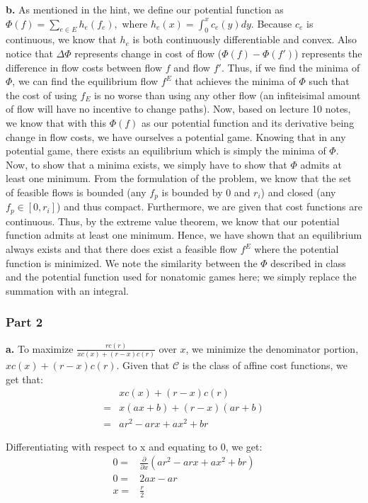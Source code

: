 \documentclass[12 pt]{article}
\begin{document}
	\noindent \textbf{b.} As mentioned in the hint, we define our potential function as  $\Phi(f) = \sum_{e \in E} h_e(f_e),$ where	$h_e(x) = \int_0^x c_e(y) dy.$ Because $c_e$ is continuous, we know that $h_e$ is both continuously differentiable and convex. Also notice that $\Delta \Phi$ represents change in cost of flow ($\Phi(f) - \Phi(f')$) represents the difference in flow costs between flow $f$ and flow $f'$. Thus, if we find the minima of $\Phi$, we can find the equilibrium flow $f^E$ that achieves the minima of $\Phi$ such that the cost of using $f_E$ is no worse than using any other flow (an infiteisimal amount of flow will have no incentive to change paths). Now, based on lecture 10 notes, we know that with this $\Phi(f)$ as our potential function and its derivative being change in flow costs, we have ourselves a potential game. Knowing that in any potential game, there exists an equilibrium which is simply the minima of $\Phi$. Now, to show that a minima exists, we simply have to show that $\Phi$ admits at least one minimum. From the formulation of the problem, we know that the set of feasible flows is bounded (any $f_p$ is bounded by 0 and $r_i$) and closed (any $f_p \in [0, r_i]$) and thus compact. Furthermore, we are given that cost functions are continuous. Thus, by the extreme value theorem, we know that our potential function admits at least one minimum. Hence, we have shown that an equilibrium always exists and that there does exist a feasible flow $f^E$ where the potential function is minimized. We note the similarity between the $\Phi$ described in class and the potential function used for nonatomic games here; we simply replace the summation with an integral. 
	
	\subsubsection*{Part 2}
	
	\noindent \textbf{a.} To maximize $\frac{r c(r)}{x c(x) + (r-x) c(r)}$ over $x$, we minimize the denominator portion, ${x c(x) + (r-x) c(r)}$. Given that $\mathcal{C}$ is the class of affine cost functions, we get that:
	\[
	\begin{split}
	&x c(x) + (r-x) c(r) \\
	= & x (ax + b) + (r-x) (ar + b) \\
	= & ar^2 - arx + ax^2 + br
	\end{split}
	\]
	
	\noindent Differentiating with respect to x and equating to 0, we get:
	\[
	\begin{split}
	0 = & \frac{\partial}{\partial x} (ar^2 - arx + ax^2 + br) \\
	0 = & 2ax - ar \\
	x = & \frac{r}{2} 
	\end{split}
	\]
	
\end{document}
